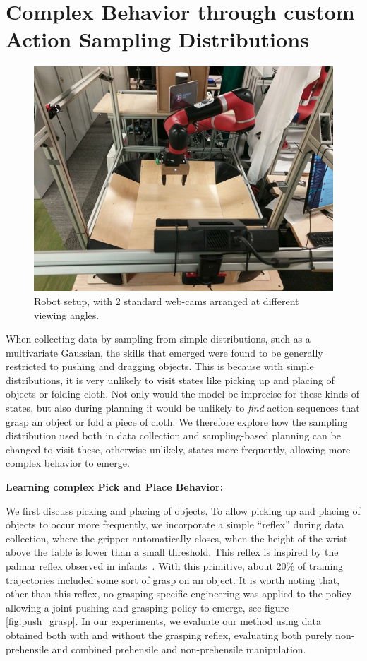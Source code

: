 \section{Complex Behavior through custom Action Sampling Distributions}
\begin{figure}
	\centering
	\includegraphics[width=1.0\linewidth]{images_general/robot_setup.jpg}
	\caption{\small{Robot setup, with 2 standard web-cams arranged at different viewing angles. }
		\label{fig:robot_setup}
	}
\end{figure}
\label{sec:system}
When collecting data by sampling from simple distributions, such as a multivariate Gaussian, the skills that emerged were found to be generally restricted to pushing and dragging objects. This is because with simple distributions, it is very unlikely to visit states like picking up and placing of objects or folding cloth. Not only would the model be imprecise for these kinds of states, but also during planning it would be unlikely to \emph{find} action sequences that grasp an object or fold a piece of cloth. 
We therefore explore how the sampling distribution used both in data collection and sampling-based planning can be changed to visit these, otherwise unlikely, states more frequently, allowing more complex behavior to emerge. 

\textbf{Learning complex Pick and Place Behavior:}

We first discuss picking and placing of objects. To allow picking up and placing of objects to occur more frequently, we incorporate a simple ``reflex'' during data collection, where the gripper automatically closes, when the height of the wrist above the table is lower than a small threshold. This reflex is inspired by the palmar reflex observed in infants~\cite{grasping_fetal}. With this primitive, about 20\% of training trajectories included some sort of grasp on an object. It is worth noting that, other than this reflex, no grasping-specific engineering was applied to the policy allowing a joint pushing and grasping policy to emerge, see figure \ref{fig:push_grasp}. In our experiments, we evaluate our method using data obtained both with and without the grasping reflex, evaluating both purely non-prehensile and combined prehensile and non-prehensile manipulation.

